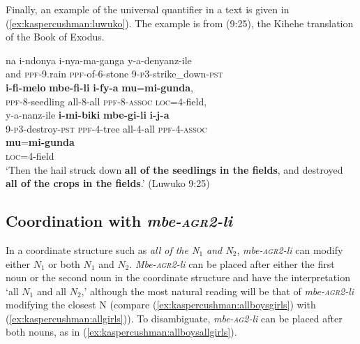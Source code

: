 \documentclass[output=paper,modfonts,nonflat]{langsci/langscibook}
\begin{document}
Finally, an example of the universal quantifier in a text is given in (\ref{ex:kaspercushman:luwuko}). The example is from \citet{ex:kaspercushman:luwuko} (9:25), the Kihehe translation of the Book of Exodus.

\begin{exe} 
 

\ex
\gll na i-ndonya i-nya-ma-ganga y-a-denyanz-ile \\ 
and \textsc{ppf}-9.rain \textsc{ppf}-of-6-stone 9-\textsc{p3}-strike\_down-\textsc{pst}\\


\gll \textbf{i-fi-melo} \textbf{mbe-fi-li} \textbf{i-fy-a} \textbf{mu}=\textbf{mi-gunda}, \\
\textsc{ppf}-8-seedling all-8-all \textsc{ppf}-8-\textsc{assoc} \textsc{loc}=4-field,\\


\gll y-a-nanz-ile \textbf{i-mi-biki} \textbf{mbe-gi-li} \textbf{i-j-a}  \\
9-\textsc{p3}-destroy-\textsc{pst} \textsc{ppf}-4-tree all-4-all \textsc{ppf}-4-\textsc{assoc}  \\


\gll \textbf{mu}=\textbf{mi-gunda} \\ 
\textsc{loc}=4-field \\


\glt `Then the hail struck down \textbf{all of the seedlings in the fields}, and destroyed \textbf{all of the crops in the fields}.' \hfill{(Luwuko 9:25)} \label{ex:kaspercushman:luwuko}\\

\end{exe}

\subsection{Coordination with \emph{mbe-\textsc{agr2}-li}}

In a coordinate structure such as \textit{all of the N$_{1}$ and N$_{2}$}, \emph{mbe-\textsc{agr2}-li}  can modify either $N_{1}$ or both $N_{1}$ and $N_{2}$.  \emph{Mbe-\textsc{agr2}-li} can be placed after either the first noun or the second noun in the coordinate structure and have the interpretation `all $N_{1}$ and all $N_{2}$,' although the most natural reading will be that of \emph{mbe-\textsc{agr2}-li} modifying the closest N (compare (\ref{ex:kaspercushman:allboysgirls}) with (\ref{ex:kaspercushman:allgirls})). To disambiguate, \emph{mbe-\textsc{ag2}-li} can be placed after both nouns, as in (\ref{ex:kaspercushman:allboysallgirls}).
\end{document}

